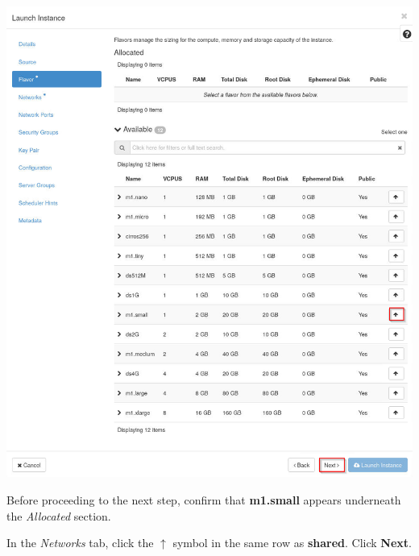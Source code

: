 \documentclass[letterpaper, 12pt]{article}
\begin{document}
\begin{enumerate}
\begin{labstep}
        \begin{center}
            \includegraphics[width=\linewidth]{images/part2/step5.png}
        \end{center}
    \end{labstep}

    \begin{stopbox}
        Before proceeding to the next step, confirm that \textbf{m1.small} appears underneath the \textit{Allocated} section.
    \end{stopbox}

    \begin{labstep}
        In the \textit{Networks} tab, click the $\uparrow$ symbol in the same row as \textbf{shared}.
        Click \textbf{Next}.


\end{labstep}
\end{enumerate}
\end{document}
